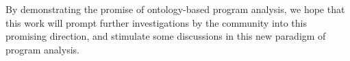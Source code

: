 By demonstrating the promise of ontology-based program analysis, we
hope that this work will prompt further investigations by the
community into this promising direction, and stimulate some
discussions in this new paradigm of program analysis.




